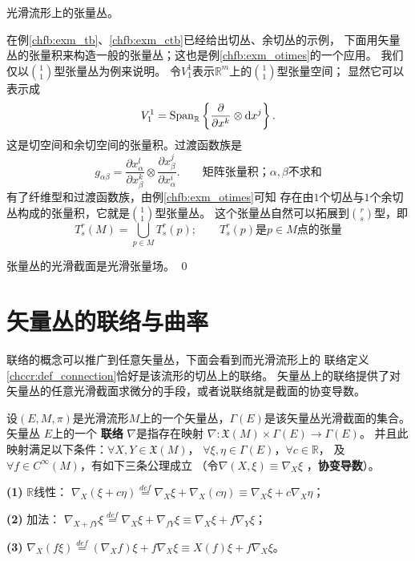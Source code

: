 \begin{example}\label{chfb:exm_tensor-bundles}
    光滑流形上的张量丛。
\end{example}
在例\ref{chfb:exm_tb}、\ref{chfb:exm_ctb}已经给出切丛、余切丛的示例，
下面用矢量丛的张量积来构造一般的张量丛；这也是例\ref{chfb:exm_otimes}的一个应用。
我们仅以$\binom{1}{1}$型张量丛为例来说明。
令$V^1_1$表示$\mathbb{R}^m$上的$\binom{1}{1}$型张量空间；
显然它可以表示成
\begin{equation*}
    V^1_1 = {\rm Span}_{\mathbb{R}}\left\{  \frac{\partial}{\partial x^k}\otimes {\rm d}x^j \right\} .
\end{equation*}
这是切空间和余切空间的张量积。过渡函数族是
\begin{equation*}
    g_{\alpha\beta} = \frac{\partial {x}^l_\alpha}{\partial {x}^k_\beta} \otimes
    \frac{\partial {x}^j_\beta}{\partial {x}^i_\alpha}  .
    \qquad \text{矩阵张量积；}\alpha,\beta \text{不求和}
\end{equation*}
有了纤维型和过渡函数族，由例\ref{chfb:exm_otimes}可知
存在由$1$个切丛与$1$个余切丛构成的张量积，它就是$\binom{1}{1}$型张量丛。
这个张量丛自然可以拓展到$\binom{r}{s}$型，即
\begin{equation*}
    T_s^r(M)=\bigcup_{p \in M} T_s^r(p); \qquad
    T_s^r(p)\text{是}p\in M\text{点的张量}
\end{equation*}


张量丛的光滑截面是光滑张量场。
\qed








\section{矢量丛的联络与曲率}\label{chfb:sec_connection}

联络的概念可以推广到任意矢量丛，下面会看到而光滑流形上的
联络定义\ref{chccr:def_connection}恰好是该流形的切丛上的联络。
矢量丛上的联络提供了对矢量丛的任意光滑截面求微分的手段，或者说联络就是截面的协变导数。


\begin{definition}\label{chfb:def_vb-conncection}
    设$(E,M,\pi)$是光滑流形$M$上的一个矢量丛，$\Gamma(E)$是该矢量丛光滑截面的集合。
    矢量丛 $E$上的一个 \textbf{联络} $\nabla$是指存在映射
    $\nabla: \mathfrak{X}(M) \times \Gamma(E) \rightarrow \Gamma(E)$。
    并且此映射满足以下条件：$\forall X, Y \in \mathfrak{X}(M)$，
    $\forall \xi, \eta \in \Gamma(E)$，$\forall c \in \mathbb{R}$，
    及 $\forall f \in C^{\infty}(M)$，有如下三条公理成立
    （令$\nabla(X, \xi)\equiv \nabla_X \xi$ ，\textbf{协变导数}）。
    
    {\bfseries (1)} $\mathbb{R}$线性： $\nabla_X(\xi+c \eta) \overset{def}{=}
     \nabla_X \xi+\nabla_X (c\eta) \equiv  \nabla_X \xi+c \nabla_X \eta$；
    
    {\bfseries (2)} 加法： $\nabla_{X+f Y} \xi \overset{def}{=} 
    \nabla_X \xi+ \nabla_{fY} \xi \equiv \nabla_X \xi+f \nabla_Y \xi$；
    
    {\bfseries (3)} $\nabla_X(f \xi) \overset{def}{=} (\nabla_X f) \xi+f \nabla_X \xi
     \equiv X(f) \xi+f \nabla_X \xi$。
\end{definition}


